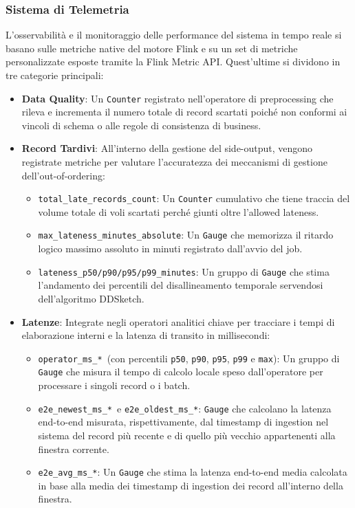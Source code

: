 \documentclass[conference]{IEEEtran}
\begin{document}
\subsubsection{Sistema di Telemetria}\label{subsubsec:flink_telemetry}
L'osservabilità e il monitoraggio delle performance del sistema in tempo reale si basano sulle metriche native del motore Flink e su un set di metriche personalizzate esposte tramite la Flink Metric API. Quest'ultime si dividono in tre categorie principali:
\begin{itemize}
    \item \textbf{Data Quality}: Un \texttt{Counter} registrato nell'operatore di preprocessing che rileva e incrementa il numero totale di record scartati poiché non conformi ai vincoli di schema o alle regole di consistenza di business.
    \item \textbf{Record Tardivi}: All'interno della gestione del side-output, vengono registrate metriche per valutare l'accuratezza dei meccanismi di gestione dell'out-of-ordering:
    \begin{itemize}
        \item \texttt{total\_late\_records\_count}: Un \texttt{Counter} cumulativo che tiene traccia del volume totale di voli scartati perché giunti oltre l'allowed lateness.
        \item \texttt{max\_lateness\_minutes\_absolute}: Un \texttt{Gauge} che memorizza il ritardo logico massimo assoluto in minuti registrato dall'avvio del job.
        \item \texttt{lateness\_p50/p90/p95/p99\_minutes}: Un gruppo di \texttt{Gauge} che stima l'andamento dei percentili del disallineamento temporale servendosi dell'algoritmo DDSketch.
    \end{itemize}
    \item \textbf{Latenze}: Integrate negli operatori analitici chiave per tracciare i tempi di elaborazione interni e la latenza di transito in millisecondi:
    \begin{itemize}
        \item \texttt{operator\_ms\_*}\ (con percentili \texttt{p50}, \texttt{p90}, \texttt{p95}, \texttt{p99} e \texttt{max}): Un gruppo di \texttt{Gauge} che misura il tempo di calcolo locale speso dall'operatore per processare i singoli record o i batch.
        \item \texttt{e2e\_newest\_ms\_*}\ e \texttt{e2e\_oldest\_ms\_*}: \texttt{Gauge} che calcolano la latenza end-to-end misurata, rispettivamente, dal timestamp di ingestion nel sistema del record più recente e di quello più vecchio appartenenti alla finestra corrente.
        \item \texttt{e2e\_avg\_ms\_*}: Un \texttt{Gauge} che stima la latenza end-to-end media calcolata in base alla media dei timestamp di ingestion dei record all'interno della finestra.
    \end{itemize}
\end{itemize}
\end{document}
